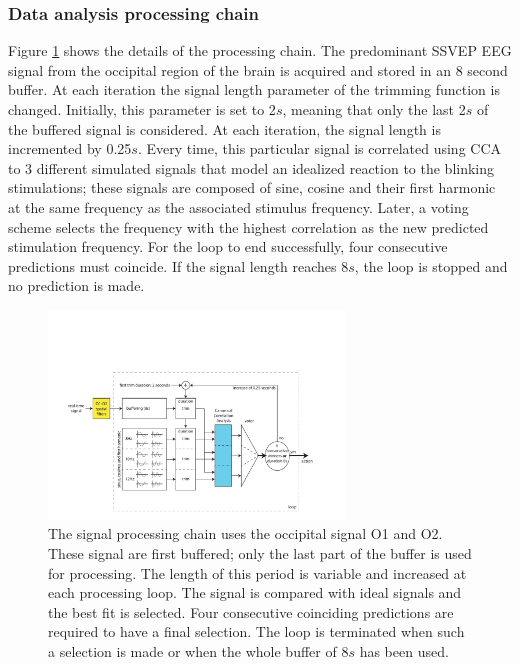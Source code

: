 \documentclass[smallextended]{svjour3}
\begin{document}
\subsubsection{Data analysis processing chain}
Figure \ref{fig:schema-openvibe-cca} shows the details of the processing chain. The predominant SSVEP EEG signal from the occipital region of the brain is acquired and stored in an 8 second buffer. At each iteration the signal length parameter of the trimming function is changed. Initially, this parameter is set to 2$s$, meaning that only the last 2$s$ of the buffered signal is considered. At each iteration, the signal length is incremented by 0.25$s$. Every time, this particular signal is correlated using CCA to 3 different simulated signals that model an idealized reaction to the blinking stimulations; these signals are composed of sine, cosine and their first harmonic at the same frequency as the associated stimulus frequency. Later, a voting scheme selects the frequency with the highest correlation as the new predicted stimulation frequency. For the loop to end successfully, four consecutive predictions must coincide. If the signal length reaches 8$s$, the loop is stopped and no prediction is made.

\begin{figure}
\center
\includegraphics[width=0.7\textwidth]{figures/schema-openvibe-cca.pdf}
\caption{The signal processing chain uses the occipital signal O1 and O2. These signal are first buffered; only the last part of the buffer is used for processing. The length of this period is variable and increased at each processing loop. The signal is compared with ideal signals and the best fit is selected. Four consecutive coinciding predictions are required to have a final selection. The loop is terminated when such a selection is made or when the whole buffer of 8$s$ has been used.}
\label{fig:schema-openvibe-cca}
\end{figure}
\end{document}
